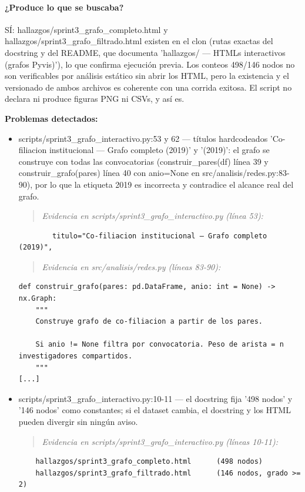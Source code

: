 \paragraph{¿Produce lo que se buscaba?}
SÍ: hallazgos/sprint3\_grafo\_completo.html y hallazgos/sprint3\_grafo\_filtrado.html existen en el clon (rutas exactas del docstring y del README, que documenta 'hallazgos/ --- HTMLs interactivos (grafos Pyvis)'), lo que confirma ejecución previa. Los conteos 498/146 nodos no son verificables por análisis estático sin abrir los HTML, pero la existencia y el versionado de ambos archivos es coherente con una corrida exitosa. El script no declara ni produce figuras PNG ni CSVs, y así es.

\begin{tcolorbox}[riesgo]
\textbf{Problemas detectados:}
\begin{itemize}
  \item scripts/sprint3\_grafo\_interactivo.py:53 y 62 --- títulos hardcodeados 'Co-filiacion institucional --- Grafo completo (2019)' y '(2019)': el grafo se construye con todas las convocatorias (construir\_pares(df) línea 39 y construir\_grafo(pares) línea 40 con anio=None en src/analisis/redes.py:83-90), por lo que la etiqueta 2019 es incorrecta y contradice el alcance real del grafo.
\begin{quote}\footnotesize\ttfamily
\noindent\emph{Evidencia en scripts/sprint3\_grafo\_interactivo.py (línea 53):}
\end{quote}
\begin{lstlisting}
        titulo="Co-filiacion institucional — Grafo completo (2019)",
\end{lstlisting}

\begin{quote}\footnotesize\ttfamily
\noindent\emph{Evidencia en src/analisis/redes.py (líneas 83-90):}
\end{quote}
\begin{lstlisting}
def construir_grafo(pares: pd.DataFrame, anio: int = None) -> nx.Graph:
    """
    Construye grafo de co-filiacion a partir de los pares.

    Si anio != None filtra por convocatoria. Peso de arista = n investigadores compartidos.
    """
[...]
\end{lstlisting}

  \item scripts/sprint3\_grafo\_interactivo.py:10-11 --- el docstring fija '498 nodos' y '146 nodos' como constantes; si el dataset cambia, el docstring y los HTML pueden divergir sin ningún aviso.
\begin{quote}\footnotesize\ttfamily
\noindent\emph{Evidencia en scripts/sprint3\_grafo\_interactivo.py (líneas 10-11):}
\end{quote}
\begin{lstlisting}
    hallazgos/sprint3_grafo_completo.html      (498 nodos)
    hallazgos/sprint3_grafo_filtrado.html      (146 nodos, grado >= 2)
\end{lstlisting}

\end{itemize}
\end{tcolorbox}

